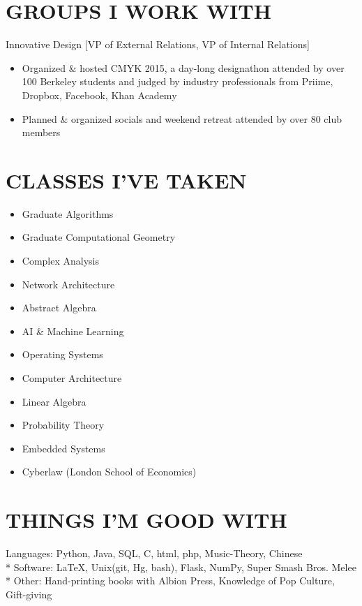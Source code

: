 \documentclass[line,mm]{res}
\begin{document}
\begin{resume}
    \section{GROUPS I WORK WITH}
    {\sc Innovative Design} \hfill{[VP of External Relations, VP of Internal Relations]}
        \begin{itemize} \itemsep -2pt
        \item Organized \& hosted CMYK 2015, a day-long designathon attended by over 100 Berkeley students and judged by industry professionals from Priime, Dropbox, Facebook, Khan Academy
        \item Planned \& organized socials and weekend retreat  attended by over 80 club members
        \end{itemize}
\fi
    \section{CLASSES I'VE TAKEN}
    \vspace{-3pt}
    \begin{multicols}{2}    
    \begin{itemize}[itemsep=-1pt]
    \item Graduate Algorithms  
    \item Graduate Computational Geometry
    \item Complex Analysis
    \item Network Architecture
    \item Abstract Algebra
    \item AI \& Machine Learning
    \item Operating Systems
    \item Computer Architecture
    \item Linear Algebra
    \item Probability Theory 
    \item Embedded Systems
    \item Cyberlaw (London School of Economics)
    \end{itemize}
    \end{multicols}
   \vspace{-23pt} 
	\section{THINGS I'M GOOD WITH} Languages: Python, Java, SQL, C, html, php, Music-Theory, Chinese
	\\* Software: \LaTeX, Unix(git, Hg, bash), Flask, NumPy, Super Smash Bros. Melee
	\\* Other: Hand-printing books with Albion Press, Knowledge of Pop Culture,  Gift-giving
\end{resume}
\end{document}
